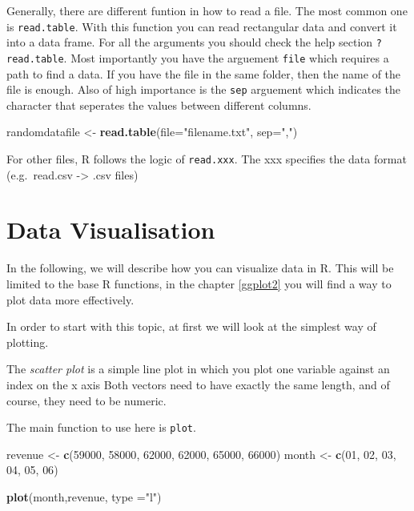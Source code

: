\documentclass[]{report}
\newenvironment{Shaded}{\begin{snugshade}}{\end{snugshade}}
\newcommand{\KeywordTok}[1]{\textcolor[rgb]{0.13,0.29,0.53}{\textbf{#1}}}
\newcommand{\DataTypeTok}[1]{\textcolor[rgb]{0.13,0.29,0.53}{#1}}
\newcommand{\DecValTok}[1]{\textcolor[rgb]{0.00,0.00,0.81}{#1}}
\newcommand{\StringTok}[1]{\textcolor[rgb]{0.31,0.60,0.02}{#1}}
\newcommand{\NormalTok}[1]{#1}
\begin{document}
Generally, there are different funtion in how to read a file. The most
common one is \texttt{read.table}. With this function you can read
rectangular data and convert it into a data frame. For all the arguments
you should check the help section \texttt{?read.table}. Most importantly
you have the arguement \texttt{file} which requires a path to find a
data. If you have the file in the same folder, then the name of the file
is enough. Also of high importance is the \texttt{sep} arguement which
indicates the character that seperates the values between different
columns.

\begin{Shaded}
\begin{Highlighting}[]
\NormalTok{randomdatafile <-}\StringTok{ }\KeywordTok{read.table}\NormalTok{(}\DataTypeTok{file=}\StringTok{"filename.txt"}\NormalTok{,}
                             \DataTypeTok{sep=}\StringTok{","}\NormalTok{)}
\end{Highlighting}
\end{Shaded}

For other files, R follows the logic of \texttt{read.xxx}. The xxx
specifies the data format (e.g.~read.csv -\textgreater{} .csv files)

\section{Data Visualisation}\label{data-visualisation}

In the following, we will describe how you can visualize data in R. This
will be limited to the base R functions, in the chapter \ref{ggplot2}
you will find a way to plot data more effectively.

In order to start with this topic, at first we will look at the simplest
way of plotting.

The \emph{scatter plot} is a simple line plot in which you plot one
variable against an index on the x axis Both vectors need to have
exactly the same length, and of course, they need to be numeric.

The main function to use here is \texttt{plot}.

\begin{Shaded}
\begin{Highlighting}[]
\NormalTok{revenue <-}\StringTok{ }\KeywordTok{c}\NormalTok{(}\DecValTok{59000}\NormalTok{, }\DecValTok{58000}\NormalTok{, }\DecValTok{62000}\NormalTok{, }\DecValTok{62000}\NormalTok{, }\DecValTok{65000}\NormalTok{, }\DecValTok{66000}\NormalTok{)}
\NormalTok{month <-}\StringTok{ }\KeywordTok{c}\NormalTok{(}\DecValTok{01}\NormalTok{, }\DecValTok{02}\NormalTok{, }\DecValTok{03}\NormalTok{, }\DecValTok{04}\NormalTok{, }\DecValTok{05}\NormalTok{, }\DecValTok{06}\NormalTok{)}

\KeywordTok{plot}\NormalTok{(month,revenue, }\DataTypeTok{type =}\StringTok{"l"}\NormalTok{)}
\end{Highlighting}
\end{Shaded}
\end{document}
